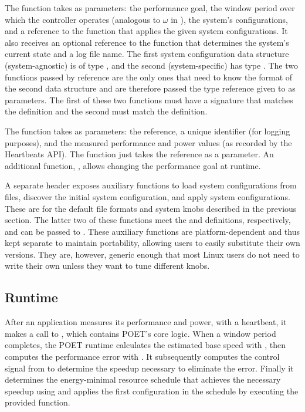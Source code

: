 The  function takes as parameters: the performance goal, the window period over which the controller operates (analogous to $\omega$ in ), the system's configurations, and a reference to the function that applies the given system configurations.
It also receives an optional reference to the function that determines the system's current state and a log file name.
The first system configuration data structure (system-agnostic) is of type , and the second (system-specific) has type .
The two functions passed by reference are the only ones that need to know the format of the second data structure and are therefore passed the  type reference given to  as parameters.
The first of these two functions must have a signature that matches the  definition and the second must match the  definition.

The  function takes as parameters: the  reference, a unique identifier (for logging purposes), and the measured performance and power values (\eg as recorded by the Heartbeats API).
The  function just takes the  reference as a parameter.
An additional function, , allows changing the performance goal at runtime.

A separate header exposes auxiliary functions to load system configurations from files, discover the initial system configuration, and apply system configurations.
These are for the default file formats and system knobs described in the previous section.
The latter two of these functions meet the  and  definitions, respectively, and can be passed to .
These auxiliary functions are platform-dependent and thus kept separate to maintain portability, allowing users to easily substitute their own versions.
They are, however, generic enough that most Linux users do not need to write their own unless they want to tune different knobs.


\subsection{Runtime}

After an application measures its performance and power, \eg with a heartbeat, it makes a call to , which contains POET's core logic.
When a window period completes, the POET runtime calculates the estimated base speed with , then computes the performance error with .
It subsequently computes the control signal from  to determine the speedup necessary to eliminate the error.
Finally it determines the energy-minimal resource schedule that achieves the necessary speedup using  and applies the first configuration in the schedule by executing the provided  function.

